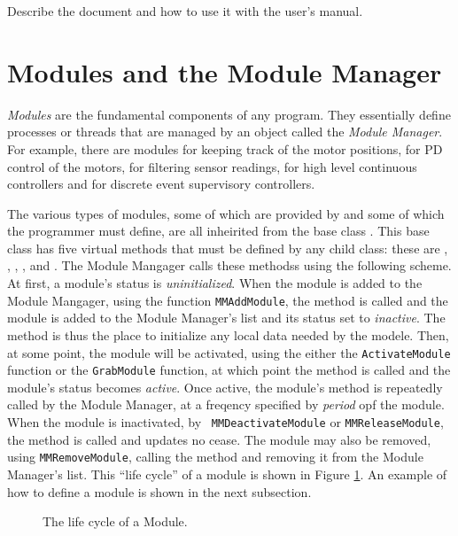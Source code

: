\documentclass[12pt, letterpaper]{article}
\begin{document}
Describe the document and how to use it with the user's manual.

\section{Modules and the Module Manager}

{\it Modules} are the fundamental components of any \rhexlib program. They essentially define
processes or threads that are managed by an object called the {\it Module Manager}. For example,
there are modules for keeping track of the motor positions, for PD control of the motors, for
filtering sensor readings, for high level continuous controllers and for discrete event supervisory
controllers. 

The various types of modules, some of which are provided by \rhexlib and some of which the
programmer must define, are all inheirited from the base class \Module. This base class has five
virtual methods that must be defined by any child class: these are \initFN, \activateFN,
\deactivateFN, \uninitFN, and \updateFN. The Module Mangager calls these methodss using the
following scheme. At first, a module's status is {\it uninitialized}. When the module is added to
the Module Mangager, using the function {\tt MMAddModule}, the \initFN method is called and the
module is added to the Module Manager's list and its status set to {\it inactive}. The \initFN
method is thus the place to initialize any local data needed by the modele. Then, at some point, the
module will be activated, using the either the {\tt ActivateModule} function or the {\tt GrabModule}
function, at which point the \activateFN method is called and the module's status becomes {\it
active}. Once active, the module's \updateFN method is repeatedly called by the Module Manager, at a
freqency specified by {\it period} opf the module. When the module is inactivated, by {\tt
MMDeactivateModule} or {\tt MMReleaseModule}, the \deactivateFN method is called and updates no
cease. The module may also be removed, using {\tt MMRemoveModule}, calling the \uninitFN method and
removing it from the Module Manager's list. This ``life cycle'' of a module is shown in Figure
\ref{fig-life-cycle}. An example of how to define a module is shown in the next subsection.

\begin{figure}[t]
\begin{center}
\caption{The life cycle of a Module. 
\label{fig-life-cycle}}
\end{center}
\end{figure}
\end{document}
